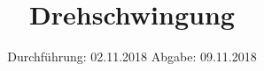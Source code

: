 

\subject{V102}
\title{Drehschwingung}
\date{
  Durchführung: 02.11.2018
  \hspace{3em}
  Abgabe: 09.11.2018
}



\maketitle
\thispagestyle{empty}
\tableofcontents
\newpage









\printbibliography{}

